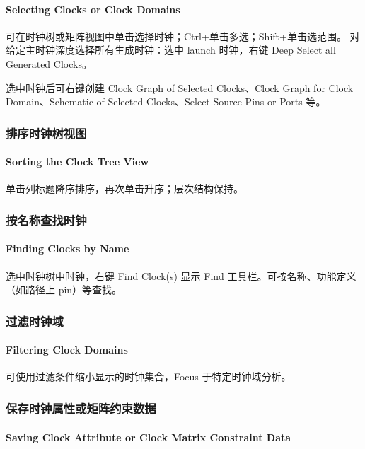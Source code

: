 \paragraph*{Selecting Clocks or Clock Domains}

可在时钟树或矩阵视图中单击选择时钟；Ctrl+单击多选；Shift+单击选范围。
对给定主时钟深度选择所有生成时钟：选中 launch 时钟，右键 Deep Select all Generated Clocks。

选中时钟后可右键创建 Clock Graph of Selected Clocks、Clock Graph for Clock Domain、Schematic of Selected Clocks、Select Source Pins or Ports 等。

\subsubsection{排序时钟树视图}
\paragraph*{Sorting the Clock Tree View}

单击列标题降序排序，再次单击升序；层次结构保持。

\subsubsection{按名称查找时钟}
\paragraph*{Finding Clocks by Name}

选中时钟树中时钟，右键 Find Clock(s) 显示 Find 工具栏。可按名称、功能定义（如路径上 pin）等查找。


\subsubsection{过滤时钟域}
\paragraph*{Filtering Clock Domains}

可使用过滤条件缩小显示的时钟集合，Focus 于特定时钟域分析。

\subsubsection{保存时钟属性或矩阵约束数据}
\paragraph*{Saving Clock Attribute or Clock Matrix Constraint Data}

